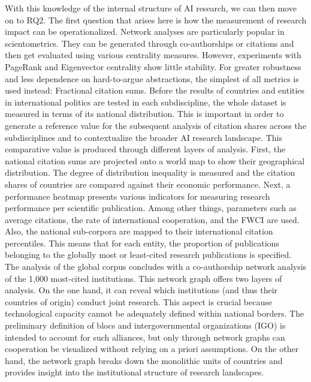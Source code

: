 \documentclass{article}
\begin{document}
	With this knowledge of the internal structure of AI research, we can then move on to RQ2. The first question that arises here is how the measurement of research impact can be operationalized. Network analyses are particularly popular in scientometrics. They can be generated through co-authorships or citations and then get evaluated using various centrality measures. However, experiments with PageRank and Eigenvector centrality show little stability. For greater robustness and less dependence on hard-to-argue abstractions, the simplest of all metrics is used instead: Fractional citation sums. Before the results of countries and entities in international politics are tested in each subdiscipline, the whole dataset is measured in terms of its national distribution. This is important in order to generate a reference value for the subsequent analysis of citation shares across the subdisciplines and to contextualize the broader AI research landscape. This comparative value is produced through different layers of analysis. First, the national citation sums are projected onto a world map to show their geographical distribution. The degree of distribution inequality is measured and the citation shares of countries are compared against their economic performance. Next, a performance heatmap presents various indicators for measuring research performance per scientific publication. Among other things, parameters such as average citations, the rate of international cooperation, and the FWCI are used. Also, the national sub-corpora are mapped to their international citation percentiles. This means that for each entity, the proportion of publications belonging to the globally most or least-cited research publications is specified. The analysis of the global corpus concludes with a co-authorship network analysis of the 1,000 most-cited institutions. This network graph offers two layers of analysis. On the one hand, it can reveal which institutions (and thus their countries of origin) conduct joint research. This aspect is crucial because technological capacity cannot be adequately defined within national borders. The preliminary definition of blocs and intergovernmental organizations (IGO) is intended to account for such alliances, but only through network graphs can cooperation be visualized without relying on a priori assumptions. On the other hand, the network graph breaks down the monolithic units of countries and provides insight into the institutional structure of research landscapes.
	
\end{document}
